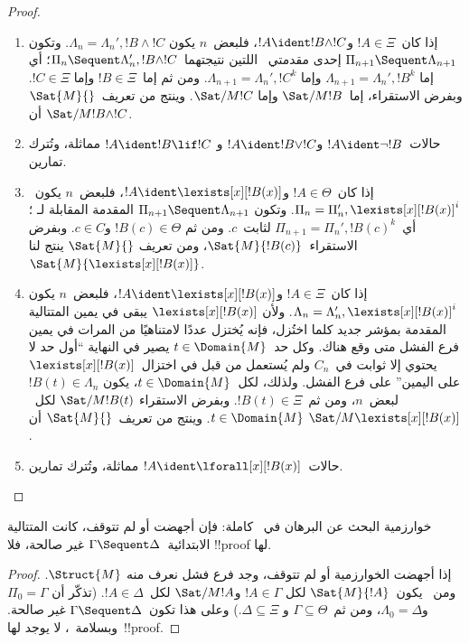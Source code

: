 \documentclass[../../../include/open-logic-section]{subfiles}
\begin{document}
\begin{proof}
\begin{enumerate}
  \item إذا كان~$!A\in\Xi$ و$!A\ident !B\land !C$، فلبعض~$n$ يكون
  $\Lambda_n=\Lambda_n',!B\land !C$. وتكون
  $\Pi_{n+1}\Sequent\Lambda_{n+1}$ إحدى مقدمتي~\RightR{\land} اللتين
  نتيجتهما~$\Pi_n\Sequent\Lambda_n',!B\land !C$؛ أي إما
  $\Lambda_{n+1}=\Lambda_n',!B^k$ وإما
  $\Lambda_{n+1}=\Lambda_n',!C^k$. ومن ثم إما~$!B\in\Xi$ وإما
  $!C\in\Xi$. وبفرض الاستقراء، إما~$\Sat/{M}{!B}$ وإما
  $\Sat/{M}{!C}$. وينتج من تعريف~$\Sat{M}{}$ أن
  $\Sat/{M}{!B\land !C}$.
  
  \item حالات~$!A\ident\lnot !B$ و$!A\ident !B\lor !C$ و
  $!A\ident !B\lif !C$ مماثلة، وتُترك تمارين.

  \item إذا كان~$!A\in\Theta$ و$!A\ident\lexists[x][!B(x)]$، فلبعض~$n$
  يكون~$\Pi_n=\Pi_n',\lexists[x][!B(x)]^i$. وتكون
  $\Pi_{n+1}\Sequent\Lambda_{n+1}$ المقدمة المقابلة لـ
  \LeftR{\lexists}؛ أي~$\Pi_{n+1}=\Pi_n',!B(c)^k$ لثابت~$c$. ومن ثم
  $!B(c)\in\Theta$ و$c\in C$. وبفرض الاستقراء~$\Sat{M}{!B(c)}$، ومن تعريف
  $\Sat{M}{}$ ينتج لنا~$\Sat{M}{\lexists[x][!B(x)]}$.

  \item إذا كان~$!A\in\Xi$ و$!A\ident\lexists[x][!B(x)]$، فلبعض~$n$ يكون
  $\Lambda_n=\Lambda_n',\lexists[x][!B(x)]^i$. ولأن
  $\lexists[x][!B(x)]$ يبقى في يمين المتتالية المقدمة بمؤشر جديد كلما
  اختُزل، فإنه يُختزل عددًا لامتناهيًا من المرات في يمين فرع الفشل متى وقع
  هناك. وكل حد~$t\in\Domain{M}$ يصير في النهاية ``أول حد لا يحتوي إلا
  ثوابت في~$C_n$ ولم يُستعمل من قبل في اختزال~$\lexists[x][!B(x)]$ على
  اليمين'' على فرع الفشل. ولذلك، لكل~$t\in\Domain{M}$، يكون
  $!B(t)\in\Lambda_n$ لبعض~$n$، ومن ثم~$!B(t)\in\Xi$. وبفرض الاستقراء
  $\Sat/{M}{!B(t)}$ لكل~$t\in\Domain{M}$. وينتج من تعريف~$\Sat{M}{}$ أن
  $\Sat/{M}{\lexists[x][!B(x)]}$.

  \item حالات~$!A\ident\lforall[x][!B(x)]$ مماثلة، وتُترك تمارين.
\end{enumerate}
\end{proof}

\begin{cor}
خوارزمية البحث عن البرهان في~ كاملة: فإن أجهضت أو لم تتوقف،
كانت المتتالية الابتدائية~$\Gamma \Sequent \Delta$ غير صالحة، فلا
!!{proof} لها.
\end{cor}

\begin{proof}
  إذا أجهضت الخوارزمية أو لم تتوقف، وجد فرع فشل نعرف منه
  $\Struct{M}$. ومن~ يكون~$\Sat{M}{!A}$ لكل
  $!A\in\Gamma$ و$\Sat/{M}{!A}$ لكل~$!A\in\Delta$. (تذكّر أن
  $\Pi_0=\Gamma$ و$\Lambda_0=\Delta$، ومن ثم~$\Gamma\subseteq\Theta$ و
  $\Delta\subseteq\Xi$.) وعلى هذا تكون~$\Gamma \Sequent \Delta$ غير صالحة.
  وبسلامة~، لا يوجد لها~!!{proof}.
\end{proof}
\end{document}
